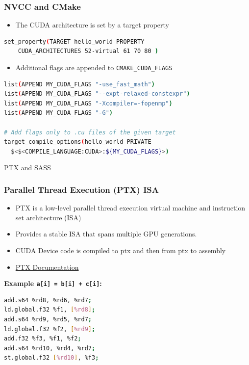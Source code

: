 \documentclass[aspectratio=169,handout]{beamer}
\begin{document}
\begin{frame}[fragile]
\frametitle{NVCC and CMake}
\begin{itemize}
	\item The CUDA architecture is set by a target property
\end{itemize}
\begin{lstlisting}[language=bash]
set_property(TARGET hello_world PROPERTY 
	CUDA_ARCHITECTURES 52-virtual 61 70 80 )
\end{lstlisting}
\begin{itemize}
	\item Additional flags are appended to \texttt{CMAKE\_CUDA\_FLAGS} 
\end{itemize}
\begin{lstlisting}[language=bash]
list(APPEND MY_CUDA_FLAGS "-use_fast_math")
list(APPEND MY_CUDA_FLAGS "--expt-relaxed-constexpr")
list(APPEND MY_CUDA_FLAGS "-Xcompiler=-fopenmp")
list(APPEND MY_CUDA_FLAGS "-G")

# Add flags only to .cu files of the given target
target_compile_options(hello_world PRIVATE
  $<$<COMPILE_LANGUAGE:CUDA>:${MY_CUDA_FLAGS}>)
\end{lstlisting}

\end{frame}


\frame
{
\begin{center}
\Large PTX and SASS
\end{center}
}

\begin{frame}[fragile]
\frametitle{Parallel Thread Execution (PTX) ISA}
\begin{itemize}
	\item PTX is a low-level parallel thread execution virtual machine and instruction set architecture (ISA)
	\item Provides a stable ISA that spans multiple GPU generations.
	\item CUDA Device code is compiled to ptx and then from ptx to assembly
	\item \href{https://docs.nvidia.com/cuda/parallel-thread-execution/index.html}{PTX Documentation}
\end{itemize}
\textbf{Example \texttt{a[i] = b[i] + c[i]}:}
\begin{lstlisting}[language=bash]
add.s64 %rd8, %rd6, %rd7;
ld.global.f32 %f1, [%rd8];
add.s64 %rd9, %rd5, %rd7;
ld.global.f32 %f2, [%rd9];
add.f32 %f3, %f1, %f2;
add.s64 %rd10, %rd4, %rd7;
st.global.f32 [%rd10], %f3;
\end{lstlisting}
\end{frame}
\end{document}
